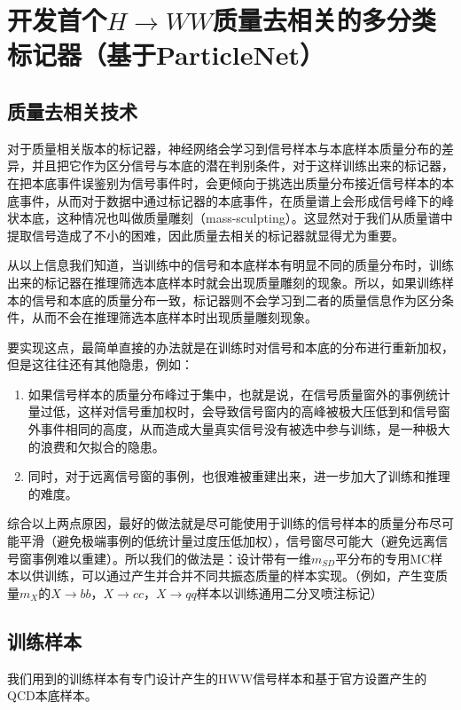 \chapter{开发首个$H\to WW$质量去相关的多分类标记器（基于ParticleNet）}
\label{chap5}
\fontsize{12bp}{14.4pt}

\section{质量去相关技术}
对于质量相关版本的标记器，神经网络会学习到信号样本与本底样本质量分布的差异，并且把它作为区分信号与本底的潜在判别条件，对于这样训练出来的标记器，在把本底事件误鉴别为信号事件时，会更倾向于挑选出质量分布接近信号样本的本底事件，从而对于数据中通过标记器的本底事件，在质量谱上会形成信号峰下的峰状本底，这种情况也叫做质量雕刻（mass-sculpting）。这显然对于我们从质量谱中提取信号造成了不小的困难，因此质量去相关的标记器就显得尤为重要。

从以上信息我们知道，当训练中的信号和本底样本有明显不同的质量分布时，训练出来的标记器在推理筛选本底样本时就会出现质量雕刻的现象。所以，如果训练样本的信号和本底的质量分布一致，标记器则不会学习到二者的质量信息作为区分条件，从而不会在推理筛选本底样本时出现质量雕刻现象。

要实现这点，最简单直接的办法就是在训练时对信号和本底的分布进行重新加权，但是这往往还有其他隐患，例如：
\begin{enumerate}[(1)]
    \item 如果信号样本的质量分布峰过于集中，也就是说，在信号质量窗外的事例统计量过低，这样对信号重加权时，会导致信号窗内的高峰被极大压低到和信号窗外事件相同的高度，从而造成大量真实信号没有被选中参与训练，是一种极大的浪费和欠拟合的隐患。
    \item 同时，对于远离信号窗的事例，也很难被重建出来，进一步加大了训练和推理的难度。
\end{enumerate}
综合以上两点原因，最好的做法就是尽可能使用于训练的信号样本的质量分布尽可能平滑（避免极端事例的低统计量过度压低加权），信号窗尽可能大（避免远离信号窗事例难以重建）。所以我们的做法是：设计带有一维$ m_{SD}$平分布的专用MC样本以供训练，可以通过产生并合并不同共振态质量的样本实现。（例如，产生变质量$m_X$的$X\to bb$，$X\to cc$，$X\to qq$样本以训练通用二分叉喷注标记）
\section{训练样本}
我们用到的训练样本有专门设计产生的HWW信号样本和基于官方设置产生的QCD本底样本。

